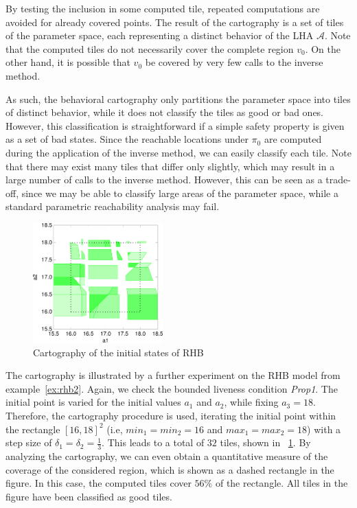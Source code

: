 \documentclass{llncs}
\newcommand{\A}{\ensuremath{\mathcal{A}}}
\begin{document}
By testing the inclusion in some computed tile, repeated computations
are avoided for already covered points. The result of the cartography
is a set of tiles of the parameter space, each representing a
distinct behavior of the LHA \A. Note that the computed tiles do not
necessarily cover the complete region $v_0$. On the other hand, it is
possible that $v_0$ be covered by very few calls to the inverse
method.

As such, the behavioral cartography only partitions the parameter
space into tiles of distinct behavior, while it does not classify the
tiles as good or bad ones. However, this classification is
straightforward if a simple safety property is given as a set of bad
states. Since the reachable locations under $\pi_0$ are computed
during the application of the inverse method, we can easily classify
each tile. Note that there may exist many tiles that differ only
slightly, which may result in a large number of calls to the inverse
method. However, this can be seen as a trade-off, since we may be able
to classify large areas of the parameter space, while a standard
parametric reachability analysis may fail. 

\begin{example}
  \begin{figure}[tb]
    \centering
    \includegraphics[width=5cm]{images/rhb_cart2.pdf}
    \caption{Cartography of the initial states of RHB}\label{fig:cart_rhb}
  \end{figure}

  The cartography is illustrated by a further experiment on the RHB
  model from example~\ref{ex:rhb2}. Again, we check the bounded
  liveness condition \textit{Prop1}. The initial point is varied for
  the initial values $a_1$ and $a_2$, while fixing $a_3 =
  18$. Therefore, the cartography procedure is used, iterating the
  initial point within the rectangle $[16,18]^2$ (i.e,
  $min_1=min_2=16$ and $max_1=max_2=18$) with a step size of
  $\delta_1=\delta_2=\frac{1}{3}$. This leads to a total of $32$
  tiles, shown in \figurename~\ref{fig:cart_rhb}. By analyzing the
  cartography, we can even obtain a quantitative measure of the
  coverage of the considered region, which is shown as a dashed
  rectangle in the figure. In this case, the computed tiles cover $56
  \%$ of the rectangle. All tiles in the figure have been classified
  as good tiles.
\end{example}
\end{document}
